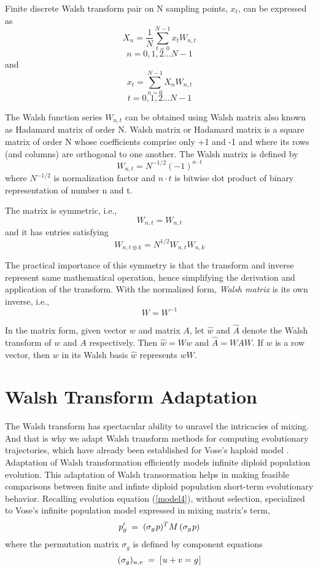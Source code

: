 Finite discrete Walsh transform pair on N sampling points, $x_t$, can be expressed as \cite{Beauchamp1975} 
\begin{equation}
\label{WalshT}
X_n = \frac{1}{N} \sum_{t=0}^{N-1} x_t W_{n,t}
\end{equation}
\[
n = 0, 1, 2...N-1
\]
and
\[
x_t = \sum_{n=0}^{N-1} X_n W_{n,t}
\]
\[
t = 0, 1, 2...N-1
\]

The Walsh function series $W_{n,t}$ can be obtained using Walsh matrix also known as Hadamard matrix of order N. 
Walsh matrix or Hadamard matrix is a square matrix of order N whose coefficients comprise only +1 and -1 and where its rows 
(and columns) are orthogonal to one another. 
The Walsh matrix is defined by
\[
W_{n,t} = N^{-1/2} (-1)^{n \cdot t}
\]
where $N^{-1/2}$ is normalization factor and $n \cdot t$ is bitwise dot product of binary representation of number n and t.

The matrix is symmetric, i.e.,
\[
W_{n,t} = W_{n,t}
\]
and it has entries satisfying
\[
W_{n, t \oplus k} = N^{1/2} W_{n, t} W_{n, k}
\]

The practical importance of this symmetry is that the transform and inverse represent same mathematical operation, hence simplifying the derivation and application of the transform. With the normalized form, \textit{Walsh matrix} is its own inverse, i.e.,
\[
W = W^{-1}
\]

In the matrix form, given vector $w$ and matrix $A$, let $\widehat{w}$ and
$\widehat{A}$ denote the Walsh transform of $w$ and $A$ respectively. Then $\widehat{w} = Ww$ and
$\widehat{A} = WAW$. If $w$ is a row vector, then $w$ in its Walsh basis $\widehat{w}$ represents $wW$.

\section{Walsh Transform Adaptation}
The Walsh transform has spectacular ability to unravel the intricacies of mixing. And that is why we adapt Walsh transform methods for computing evolutionary trajectories, which have already been established for Vose's haploid model \cite{VoseWright1998}. Adaptation of Walsh transformation efficiently models infinite diploid population evolution. This adaptation of Walsh transormation helps in making feasible comparisons between finite and infinte diploid population short-term evolutionary behavior.
Recalling evolution equation (\ref{model4}), without selection, specialized to Vose's infinite population model expressed in mixing matrix's term,
\[
p_g^\prime \; = \; (\sigma_g \hspace{0.01in} p)^T M \, (\sigma_g \hspace{0.01in} p)
\]
where the permutation matrix $\sigma_g$ is defined by component
equations
\[
(\sigma_g)_{u,v} \; = \; [\hspace{0.01in} u+v = g\hspace{0.01in} ]
\]

